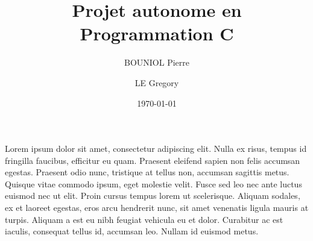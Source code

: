 \documentclass[a4paper,12pt,titlepage]{report}
\begin{document}
\title{Projet autonome en Programmation C}
\author{\textsc{BOUNIOL} Pierre\and \textsc{LE} Gregory}
\date{\today}
\maketitle

Lorem ipsum dolor sit amet, consectetur adipiscing elit. Nulla ex risus, tempus id fringilla faucibus, efficitur eu quam. Praesent eleifend sapien non felis accumsan egestas. Praesent odio nunc, tristique at tellus non, accumsan sagittis metus. Quisque vitae commodo ipsum, eget molestie velit. Fusce sed leo nec ante luctus euismod nec ut elit. Proin cursus tempus lorem ut scelerisque. Aliquam sodales, ex et laoreet egestas, eros arcu hendrerit nunc, sit amet venenatis ligula mauris at turpis. Aliquam a est eu nibh feugiat vehicula eu et dolor. Curabitur ac est iaculis, consequat tellus id, accumsan leo. Nullam id euismod metus. 
\end{document}
